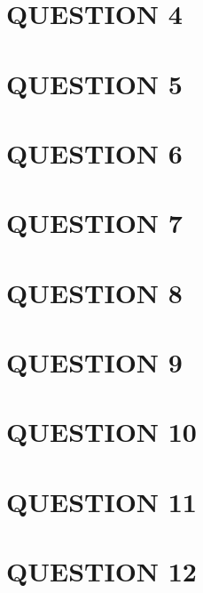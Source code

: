 \documentclass[a4paper]{article}
\begin{document}
\section{QUESTION 4}
\section{QUESTION 5}
\section{QUESTION 6}
\section{QUESTION 7}
\section{QUESTION 8}
\section{QUESTION 9}
\section{QUESTION 10}
\section{QUESTION 11}
\section{QUESTION 12}
\end{document}
